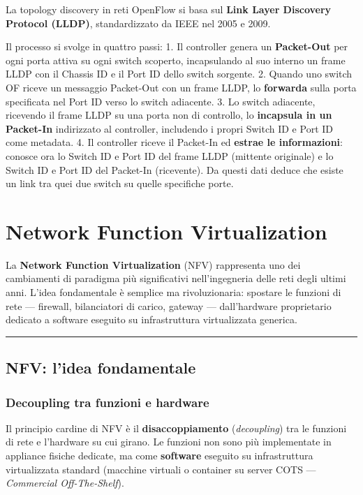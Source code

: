 \documentclass[
  italian,
  openany]{book}
\begin{document}
La topology discovery in reti OpenFlow si basa sul \textbf{Link Layer
Discovery Protocol (LLDP)}, standardizzato da IEEE nel 2005 e 2009.

Il processo si svolge in quattro passi: 1. Il controller genera un
\textbf{Packet-Out} per ogni porta attiva su ogni switch scoperto,
incapsulando al suo interno un frame LLDP con il Chassis ID e il Port ID
dello switch sorgente. 2. Quando uno switch OF riceve un messaggio
Packet-Out con un frame LLDP, lo \textbf{forwarda} sulla porta
specificata nel Port ID verso lo switch adiacente. 3. Lo switch
adiacente, ricevendo il frame LLDP su una porta non di controllo, lo
\textbf{incapsula in un Packet-In} indirizzato al controller, includendo
i propri Switch ID e Port ID come metadata. 4. Il controller riceve il
Packet-In ed \textbf{estrae le informazioni}: conosce ora lo Switch ID e
Port ID del frame LLDP (mittente originale) e lo Switch ID e Port ID del
Packet-In (ricevente). Da questi dati deduce che esiste un link tra quei
due switch su quelle specifiche porte.

\newpage

\chapter{Network Function
Virtualization}\label{network-function-virtualization}

La \textbf{Network Function Virtualization} (NFV) rappresenta uno dei
cambiamenti di paradigma più significativi nell'ingegneria delle reti
degli ultimi anni. L'idea fondamentale è semplice ma rivoluzionaria:
spostare le funzioni di rete --- firewall, bilanciatori di carico,
gateway --- dall'hardware proprietario dedicato a software eseguito su
infrastruttura virtualizzata generica.

\begin{center}\rule{0.5\linewidth}{0.5pt}\end{center}

\section{NFV: l'idea fondamentale}\label{nfv-lidea-fondamentale}

\subsection{Decoupling tra funzioni e
hardware}\label{decoupling-tra-funzioni-e-hardware}

Il principio cardine di NFV è il \textbf{disaccoppiamento}
(\emph{decoupling}) tra le funzioni di rete e l'hardware su cui girano.
Le funzioni non sono più implementate in appliance fisiche dedicate, ma
come \textbf{software} eseguito su infrastruttura virtualizzata standard
(macchine virtuali o container su server COTS --- \emph{Commercial
Off-The-Shelf}).
\end{document}
